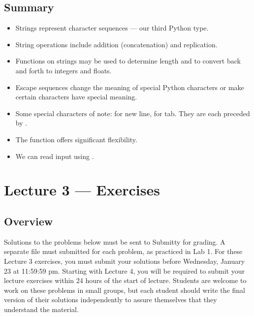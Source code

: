 \documentclass[letterpaper,10pt,english]{sphinxmanual}
\begin{document}
\section{Summary}
\label{\detokenize{lecture_notes/lec03_strings:summary}}\begin{itemize}
\item {} 
Strings represent character sequences — our third Python type.

\item {} 
String operations include addition (concatenation) and replication.

\item {} 
Functions on strings may be used to determine length and to convert
back and forth to integers and floats.

\item {} 
Escape sequences change the meaning of special Python characters or
make certain characters have special meaning.

\item {} 
Some special characters of note:  for new line,  for tab.
They are each preceded by \sphinxcode{\sphinxupquote{\textbackslash{}}}.

\item {} 
The  function offers significant flexibility.

\item {} 
We can read input using .

\end{itemize}


\chapter{Lecture 3 — Exercises}
\label{\detokenize{lecture_notes/lec03_strings_exercises/exercises:lecture-3-exercises}}\label{\detokenize{lecture_notes/lec03_strings_exercises/exercises::doc}}

\section{Overview}
\label{\detokenize{lecture_notes/lec03_strings_exercises/exercises:overview}}
Solutions to the problems below must be sent to Submitty for grading.
A separate file must submitted for each problem, as practiced in
Lab 1.  For these Lecture 3 exercises, you must submit your
solutions before Wednesday, January 23 at 11:59:59 pm. Starting with Lecture 4,
you will be required to submit your lecture exercises within 24 hours
of the start of lecture.  Students are
welcome to work on these problems in small groups, but each student
should write the final version of their solutions independently to
assure themselves that they understand the material.
\end{document}
